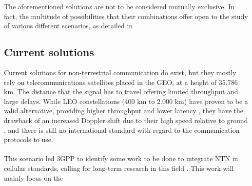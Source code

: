The aforementioned solutions are not to be considered mutually exclusive. In fact, the multitude of possibilities that their combinations offer open to the study of various different scenarios, as detailed in \cite{potential-multilayered-nierarchical-ntn-wang}

\subsection{Current solutions}
Current solutions for non-terrestrial communication do exist, but they mostly rely on telecommunications satellites placed in the \ac{GEO}, at a height of 35.786 km. The distance that the signal has to travel offering limited throughput and large delays. While \ac{LEO} constellations (400 km to 2.000 km) have proven to be a valid alternative, providing higher throughput and lower latency \cite{main-features-5g-nr-ntn-yun}, they have the drawback of an increased Doppler shift due to their high speed relative to ground \cite{satellite-communication-mmwave-giordani}, and there is still no international standard with regard to the communication protocols to use. 

\paragraph{}
This scenario led \ac{3GPP} to identify some work to be done to integrate \ac{NTN} in cellular standards, calling for long-term research in this field \cite{satellite-communication-mmwave-giordani}. This work will mainly focus on the 

